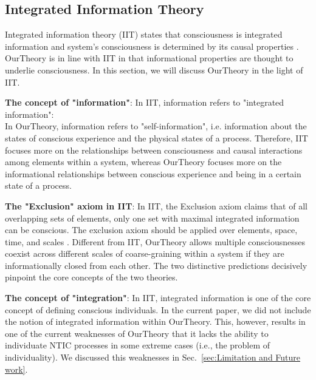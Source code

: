 \documentclass[utf8]{article}
\begin{document}
        
		\subsection{Integrated Information Theory}
            Integrated information theory (IIT) states that consciousness is integrated information and system's consciousness is determined by its causal properties \citep{tononi2016integrated}. \ac{OurTheory} is in line with IIT in that informational properties are thought to underlie consciousness. In this section, we will discuss \ac{OurTheory} in the light of IIT. 
            
            \textbf{The concept of "information"}: In IIT, information refers to "integrated information":\\  In \ac{OurTheory}, information refers to "self-information", i.e. information about the states of conscious experience and the physical states of a process. Therefore, IIT focuses more on the relationships between consciousness and causal interactions among elements within a system, whereas \ac{OurTheory} focuses more on the informational relationships between conscious experience and being in a certain state of a process. 
		    
		    \textbf{The "Exclusion" axiom in IIT}: In IIT, the Exclusion axiom claims that of all overlapping sets of elements, only one set with maximal integrated information can be conscious. The exclusion axiom should be applied over elements, space, time, and scales \citep{oizumi2014phenomenology, hoel2016can}. Different from IIT, \ac{OurTheory} allows multiple consciousnesses coexist across different scales of coarse-graining within a system if they are informationally closed from each other. The two distinctive predictions decisively pinpoint the core concepts of the two theories. 

		    \textbf{The concept of "integration"}: In IIT, integrated information is one of the core concept of defining conscious individuals. In the current paper, we did not include the notion of integrated information within \ac{OurTheory}. This, however, results in one of the current weaknesses of \ac{OurTheory} that it lacks the ability to individuate NTIC processes in some extreme cases (i.e., the problem of individuality). We discussed this weaknesses in Sec.~\ref{sec:Limitation and Future work}.
		    
\end{document}
